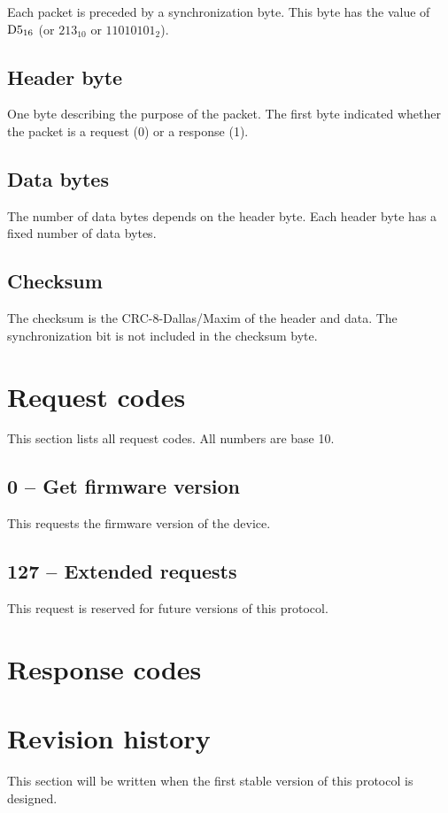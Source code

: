 \documentclass[11pt,a4paper,oneside,article]{memoir}
\begin{document}
Each packet is preceded by a synchronization byte. This byte has the
value of $\textup{D}5_{16}$ (or $213_{10}$ or $11010101_2$).


\section{Header byte}

One byte describing the purpose of the packet. The first byte
indicated whether the packet is a request (0) or a response (1).


\section{Data bytes}

The number of data bytes depends on the header byte. Each header byte
has a fixed number of data bytes.


\section{Checksum}

The checksum is the CRC-8-Dallas/Maxim of the header and data. The
synchronization bit is not included in the checksum byte.


\chapter{Request codes}

This section lists all request codes. All numbers are base 10.


\section{0 -- Get firmware version}

This requests the firmware version of the device.


\section{127 -- Extended requests}

This request is reserved for future versions of this protocol.


\chapter{Response codes}


\chapter{Revision history}

This section will be written when the first stable version of this
protocol is designed.
\end{document}
